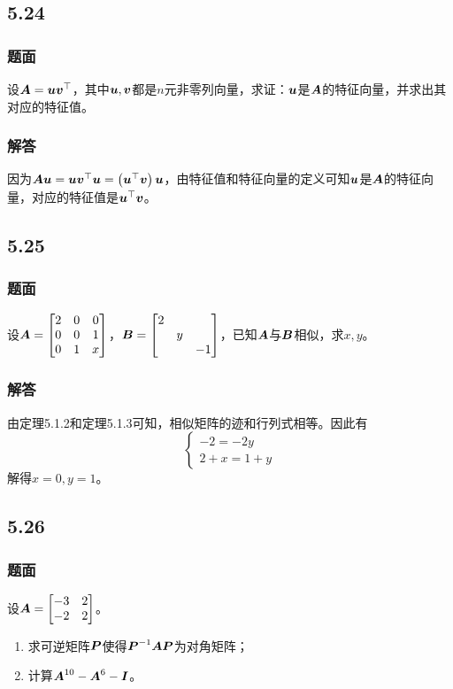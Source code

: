 \documentclass[9pt,xcolor=svgnames]{beamer} %
\begin{document}
\subsection*{5.24}
\begin{frame}
    \frametitle{题面}
    设\(\boldsymbol{A}=\boldsymbol{u}\boldsymbol{v}^\top\)，其中\(\boldsymbol{u},\boldsymbol{v}\)都是\(n\)元非零列向量，求证：\(\boldsymbol{u}\)是\(\boldsymbol{A}\)的特征向量，并求出其对应的特征值。
\end{frame}

\begin{frame}
    \frametitle{解答}
    因为\(\boldsymbol{A}\boldsymbol{u}=\boldsymbol{u}\boldsymbol{v}^\top\boldsymbol{u}=\left( \boldsymbol{u}^\top\boldsymbol{v} \right)\boldsymbol{u}\)，由特征值和特征向量的定义可知\(\boldsymbol{u}\)是\(\boldsymbol{A}\)的特征向量，对应的特征值是\(\boldsymbol{u}^\top\boldsymbol{v}\)。
\end{frame}

\subsection*{5.25}
\begin{frame}
    \frametitle{题面}
    设\(\boldsymbol{A}=\begin{bmatrix}2&0&0\\0&0&1\\0&1&x\end{bmatrix}\)，\(\boldsymbol{B}=\begin{bmatrix}2&&\\&y&\\&&-1\end{bmatrix}\)，已知\(\boldsymbol{A}\)与\(\boldsymbol{B}\)相似，求\(x,y\)。
\end{frame}

\begin{frame}
    \frametitle{解答}
    由定理5.1.2和定理5.1.3可知，相似矩阵的迹和行列式相等。因此有
    \begin{equation*}
        \begin{cases}
            -2=-2y \\
            2+x=1+y
        \end{cases}
    \end{equation*}
    解得\(x=0,y=1\)。
\end{frame}

\subsection*{5.26}
\begin{frame}
    \frametitle{题面}
    设\(\boldsymbol{A}=\begin{bmatrix}-3&2\\-2&2\end{bmatrix}\)。
    \begin{enumerate}
        \item 求可逆矩阵\(\boldsymbol{P}\)使得\({\boldsymbol{P}}^{-1}\boldsymbol{A}\boldsymbol{P}\)为对角矩阵；
        \item 计算\(\boldsymbol{A}^{10}-\boldsymbol{A}^6-\boldsymbol{I}\)。
    \end{enumerate}
\end{frame}
\end{document}
